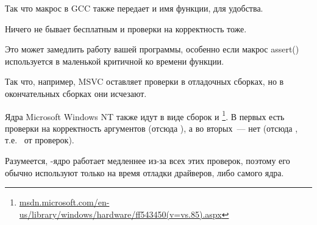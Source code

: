 Так что макрос в GCC также передает и имя функции, для удобства.

Ничего не бывает бесплатным и проверки на корректность тоже.

Это может замедлить работу вашей программы, особенно если макрос assert() используется в маленькой
критичной ко времени функции.

Так что, например, MSVC оставляет проверки в отладочных сборках, но в окончательных сборках они исчезают.
 
Ядра Microsoft \gls{Windows NT} также идут в виде сборок  и 
\footnote{\href{http://go.yurichev.com/17259}{msdn.microsoft.com/en-us/library/windows/hardware/ff543450(v=vs.85).aspx}}.
В первых есть проверки на корректность аргументов (отсюда ), а во вторых~--- нет (отсюда ,
т.е.~ от проверок).

Разумеется, -ядро работает медленнее из-за всех этих проверок, поэтому его обычно используют только на время отладки драйверов, либо самого ядра.

